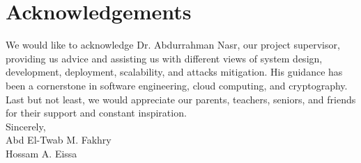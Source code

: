 \chapter*{Acknowledgements}

We would like to acknowledge Dr. Abdurrahman Nasr, our project supervisor, providing us advice and assisting us with different views of system design, development, deployment, scalability, and attacks mitigation. His guidance has been a cornerstone in software engineering, cloud computing, and cryptography. \\[16pt]

\noindent
Last but not least, we would appreciate our parents, teachers, seniors, and friends for their support and constant inspiration. \\[16pt]

\noindent
Sincerely, \\[6pt]
\noindent
Abd El-Twab M. Fakhry\\
Hossam A. Eissa